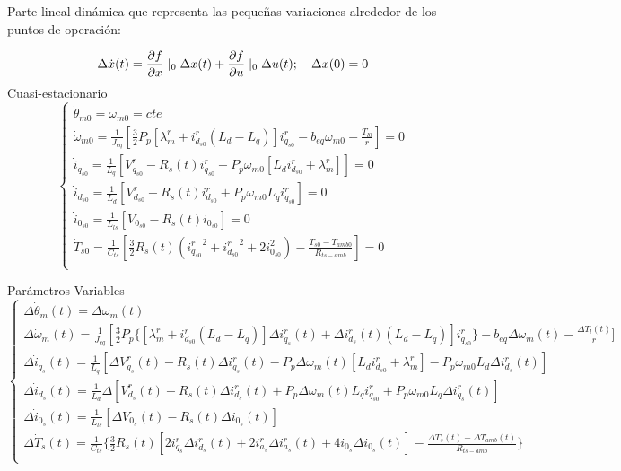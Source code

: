 \documentclass{article}
\begin{document}
Parte lineal dinámica que representa las pequeñas variaciones alrededor de los puntos de operación:

\begin{equation}
    \Delta\dot{x}(t) = \frac{\partial f}{\partial x}\mid_{0}\Delta x(t) + \frac{\partial f}{\partial u}\mid_{0}\Delta u(t); \quad \Delta x(0) = 0\\
\end{equation}
Cuasi-estacionario
\begin{equation}
    \begin{cases}
        \dot{\theta}_{m0} = \omega_{m0} = cte\\
        \dot{\omega}_{m0} = \frac{1}{J_{eq}}[\frac{3}{2}P_{p}[\lambda_{m}^r+i_{d_{s0}}^r(L_{d}-L_{q})]i_{q_{s0}}^r - b_{eq}\omega_{m0} - \frac{T_{l0}}{r}] = 0\\
        \dot{i}_{q_{s0}} = \frac{1}{L_{q}}[V_{q_{s0}}^r - R_{s}(t)i_{q_{s0}}^r - P_{p}\omega_{m0}[L_{d}i_{d_{s0}}^r+\lambda_{m}^r]] = 0\\
        \dot{i}_{d_{s0}} = \frac{1}{L_{d}}[V_{d_{s0}}^r - R_{s}(t)i_{d_{s0}}^r + P_{p}\omega_{m0}L_{q}i_{q_{s0}}^r] = 0 \\
        \dot{i}_{0_{s0}} = \frac{1}{L_{ls}}[V_{0_{s0}} - R_{s}(t)i_{0_{s0}}] = 0\\
        \dot{T}_{s0} = \frac{1}{C_{ts}}[\frac{3}{2}R_{s}(t)({i_{q_{s0}}^r}^2+{i_{d_{s0}}^r}^2+2i_{0_{s0}}^2)-\frac{T_{s0}-T_{amb0}}{R_{ts-amb}}] = 0\\
    \end{cases}
\end{equation}

Parámetros Variables
\begin{equation}
    \begin{cases}
        \Delta\dot{\theta}_{m}(t) = \Delta\omega_{m}(t)\\
        \Delta\dot{\omega}_{m}(t) = \frac{1}{J_{eq}}[\frac{3}{2}P_{p}\{[\lambda_{m}^r + i_{d_{s0}}^r(L_{d}-L_{q})]\Delta i_{q_{s}}^r(t) + \Delta i_{d_{s}}^r(t)(L_{d}-L_{q})]i_{q_{s0}}^r\}- b_{eq}\Delta\omega_{m}(t) - \frac{\Delta T_{l}(t)}{r}]\\
        \Delta\dot{i}_{q_{s}}(t) = \frac{1}{L_{q}}[\Delta V_{q_{s}}^r(t) - R_{s}(t)\Delta i_{q_{s}}^r(t) - P_{p}\Delta\omega_{m}(t)[L_{d}i_{d_{s0}}^r+\lambda_{m}^r] - P_{p}\omega_{m0}L_{d}\Delta i_{d_{s}}^r(t)] \\
        \Delta\dot{i}_{d_{s}}(t) = \frac{1}{L_{d}}\Delta [V_{d_{s}}^r(t) - R_{s}(t)\Delta i_{d_{s}}^r(t) + P_{p}\Delta\omega_{m}(t)L_{q}i_{q_{s0}}^r + P_{p}\omega_{m0}L_{q}\Delta i_{q_{s}}^r(t)]  \\
        \Delta\dot{i}_{0_{s}}(t) = \frac{1}{L_{ls}}[\Delta V_{0_{s}}(t) - R_{s}(t)\Delta i_{0_{s}}(t)] \\
        \Delta\dot{T}_{s}(t) = \frac{1}{C_{ts}}\{\frac{3}{2}R_{s}(t)[{2i_{q_{s}}^r\Delta i_{d_{s}}^r(t)} + 2i_{a_{s}}^r\Delta i_{a_{s}}^r(t)+4i_{0_{s}}\Delta i_{0_{s}}(t)]-\frac{\Delta T_{s}(t)-\Delta T_{amb}(t)}{R_{ts-amb}}\}\\
    \end{cases}
\end{equation}
\end{document}
